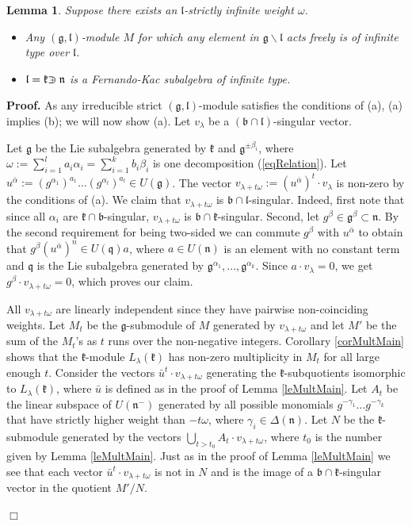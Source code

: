 \documentclass[12pt]{report}
\newtheorem{lemma}[theo]{Lemma}
\newenvironment{proof}[1][]{ \textbf{Proof#1. }}{$\Box$\medskip}
\newcommand{\kk}{\mathfrak{k}}
\newcommand{\nn}{\mathfrak{n}}
\newcommand{\qq}{\mathfrak{q}}
\newcommand{\gG}{\mathfrak{g}}
\newcommand{\bb}{\mathfrak{b}}
\newcommand{\lL}{\mathfrak{l}}
\newcommand{\refle}[1]{Lemma \ref{#1}}
\newcommand{\refcor}[1]{Corollary \ref{#1}}
\newcommand{\refeq}[1]{(\ref{#1})}
\def\crplus{\hbox{$\supset${\raise1.05pt\hbox{\kern -0.60em ${\scriptscriptstyle +}$}}\ }}
\newcommand{\pma}{\pm}%
\begin{document}
\begin{lemma}\label{leNotFK}
Suppose there exists an $\lL$-strictly infinite weight $\omega$. 
\begin{itemize}
\item[(a)] Any $(\gG,\lL)$-module $M$ for which any element in $\gG\backslash\lL$ acts freely is of infinite type over $\lL$.
\item[(b)] $\lL=\kk\crplus\nn$ is a Fernando-Kac subalgebra of infinite type. 
\end{itemize}
\end{lemma}
\begin{proof} 
As any irreducible strict $(\gG,\lL)$-module satisfies the conditions of (a), (a) implies (b); we will now show (a). Let $v_\lambda$ be a $(\bb\cap \lL)$-singular vector. 

Let $\gG$ be the Lie subalgebra generated by $\kk$ and $\gG^{\pma\beta_i}$, where $\omega:=\sum_{i=1}^l a_i\alpha_i= \sum_{i=1}^k b_i\beta_i$ is one decomposition \refeq{eqRelation}. Let $u^{ \bar \alpha}:= (g^{\alpha_1})^{a_1} \dots (g^{\alpha_l})^{a_l}\in U(\gG)$. The vector $v_{\lambda+ t\omega}:= (u^{ \bar\alpha} )^t\cdot v_\lambda$ is non-zero by the conditions of (a). We claim that $v_{\lambda+t\omega}$ is $\bb\cap \lL$-singular. Indeed, first note that since all $\alpha_i$ are $\kk \cap \bb$-singular, $v_{\lambda+t\omega}$ is $\bb\cap \kk$-singular. Second, let $g^{\beta} \in \gG^{\beta} \subset \nn$. By the second requirement for being two-sided we can commute $g^\beta$ with $u^{\bar \alpha}$ to obtain that $g^{\beta}(u^{\bar\alpha})^n \in U(\qq)  a$, where $a\in U(\nn)$ is an element with no constant term and $\qq$ is the Lie subalgebra generated by $\gG^{\alpha_1},\dots, \gG^{ \alpha_k }$. Since $a\cdot v_{\lambda}=0$, we get $g^{\beta}\cdot v_{\lambda+t\omega}=0$, which proves our claim.

All $v_{\lambda+t\omega}$ are linearly independent since they have pairwise non-coinciding weights. Let $M_t$ be the $\gG$-submodule of $M$ generated by $v_{\lambda+t\omega}$ and let $M'$ be the sum of the $M_t$'s as $t$ runs over the non-negative integers. \refcor{corMultMain} shows that the $\kk$-module $L_{\lambda }( \kk )$ has non-zero multiplicity in $M_t$ for all large enough $t$. Consider the vectors $\bar u^t\cdot v_{\lambda+t\omega}$ generating the $\kk$-subquotients isomorphic to $L_{\lambda }( \kk )$, where $\bar u$ is defined as in the proof of \refle{leMultMain}. Let $A_t$ be the linear subspace of $U(\nn^-)$ generated by all possible monomials $g^{-\gamma_1}\dots g^{-\gamma_k}$ that have strictly higher weight than $-t\omega$, where $\gamma_i\in\Delta(\nn)$. Let $N$ be the $\kk$-submodule generated by the vectors $\displaystyle \bigcup_{t> t_0}A_t \cdot v_{\lambda+t\omega}$, where $t_0$ is the number given by Lemma \ref{leMultMain}. Just as in the proof of \refle{leMultMain} we see that each vector $\bar u^t\cdot v_{\lambda+t\omega}$ is not in $N$ and is the image of a $\bb\cap\kk$-singular vector in the quotient $ M'/N $. 


\end{proof}
\end{document}
